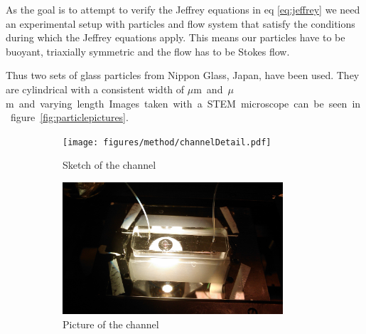 As the goal is to attempt to verify the Jeffrey equations in eq \ref{eq:jeffrey} we need an experimental setup with 
particles and flow system that satisfy the conditions during which the Jeffrey equations apply. This means our particles 
have to be buoyant, triaxially symmetric and the flow has to be Stokes flow. 



Thus two sets of glass particles from Nippon Glass, Japan\cite{Particles}, have been used. 
They are cylindrical with a consistent width of \unit[3]{$\mu$m} and \unit[5]{$\mu$m} and varying length. Images taken 
with a STEM microscope can be seen in figure \ref{fig:particlepictures}. 





\begin{figure}[H]
\centering
\begin{subfigure}[b]{0.45\textwidth}
\texttt{[image: figures/method/channelDetail.pdf]}
\caption{Sketch of the channel}\label{fig:channelsketch}
\end{subfigure}
\begin{subfigure}[b]{0.45\textwidth}
\includegraphics[width=0.9\textwidth]{figures/method/ChannelZoomed.jpg}
\caption{Picture of the channel}\label{fig:channelpicture}
\end{subfigure}
\caption{}
\label{fig:channel}
\end{figure}


